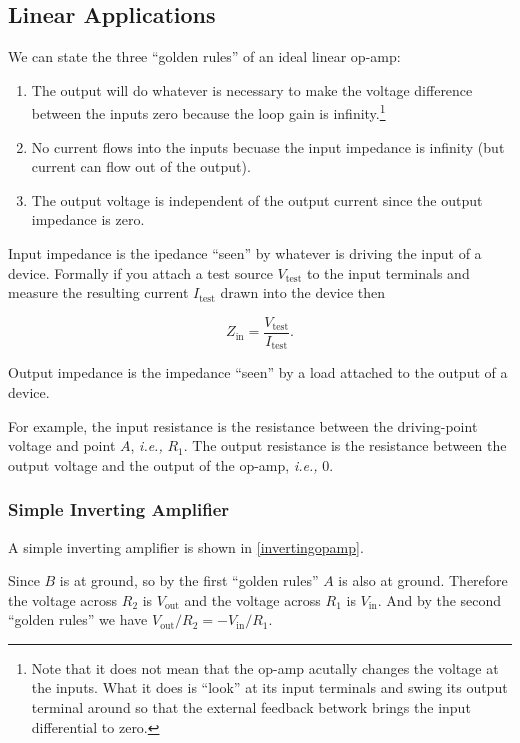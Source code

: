 \documentclass[english,a4paper,12pt]{report}
\begin{document}
\subsection{Linear Applications}

We can state the three ``golden rules'' of an ideal linear op-amp:

\begin{enumerate}
    \item The output will do whatever is necessary to make the voltage difference between the inputs zero because the loop gain is infinity.\footnote{Note that it does not mean that the op-amp acutally changes the voltage at the inputs. What it does is ``look'' at its input terminals and swing its output terminal around so that the external feedback betwork brings the input differential to zero.}
    \item No current flows into the inputs becuase the input impedance is infinity (but current can flow out of the output).
    \item The output voltage is independent of the output current since the output impedance is zero.
\end{enumerate}

Input impedance is the ipedance ``seen'' by whatever is driving the input of a device. Formally if you attach a test source \(V_{\text{test} } \) to the input terminals and measure the resulting current \(I_{\text{test} } \) drawn into the device then 

\begin{equation}
    Z_{\text{in} } = \frac{V_{\text{test} } }{I_{\text{test} } }.
\end{equation}

Output impedance is the impedance ``seen'' by a load attached to the output of a device. 

For example, the input resistance is the resistance between the driving-point voltage and point \(A\), \textit{i.e.,} \(R_1 \). The output resistance is the resistance between the output voltage and the output of the op-amp, \textit{i.e.,} 0.

\subsubsection{Simple Inverting Amplifier}

A simple inverting amplifier is shown in \cref{invertingopamp}.


Since \(B\) is at ground, so by the first ``golden rules'' \(A\) is also at ground. Therefore the voltage across \(R_2 \) is \(V_{\text{out}} \) and the voltage across \(R_1 \) is \(V_{\text{in}} \). And by the second ``golden rules'' we have \(V_{\text{out} } /R_2 = - V_{\text{in} }/ R_1  \). 
\end{document}
